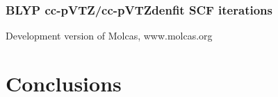 \begin{frame}
   \frametitle{BLYP cc-pVTZ/cc-pVTZdenfit SCF iterations}
   \tiny{Development version of Molcas, www.molcas.org}
    \begin{center}
        \begin{figure}
        \end{figure}
    \end{center}
\end{frame}



\section{Conclusions}

